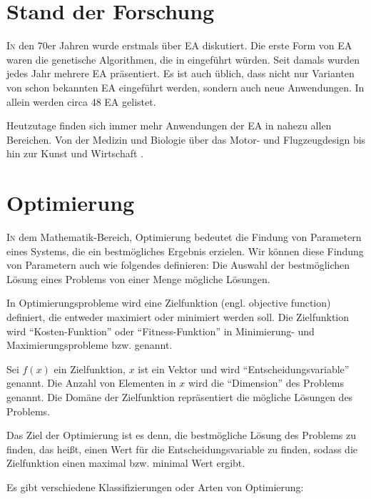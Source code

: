 \documentclass[twoside,twocolumn]{article}
\begin{document}

\section{Stand der Forschung}

\lettrine[nindent=0em,lines=3]{I} n den 70er Jahren wurde erstmals über EA diskutiert. Die erste Form von EA waren die genetische Algorithmen, die in \cite{holland_ga} eingeführt würden. Seit damals wurden jedes Jahr mehrere EA präsentiert. Es ist auch üblich, dass nicht nur Varianten von schon bekannten EA eingeführt werden, sondern auch neue Anwendungen. In \cite{algorithmen_list} allein werden circa 48 EA gelistet.\par
Heutzutage finden sich immer mehr Anwendungen der EA in nahezu allen Bereichen. Von der Medizin \cite{ea_und_medizin} und Biologie \cite{ea_und_biologie} über das Motor- \cite{ea_und_motoren} und Flugzeugdesign \cite{ea_und_flugzeuge_a} \cite{ea_und_flugzeuge_b} bis hin zur Kunst \cite{ea_und_kunst_a} \cite{ea_und_kunst_b} und Wirtschaft \cite{ea_und_wirtschaft}.


\section{Optimierung}

\lettrine[nindent=0em,lines=3]{I} n dem Mathematik-Bereich, Optimierung bedeutet die Findung von Parametern eines Systems, die ein bestmögliches Ergebnis erzielen. \cite{wiki_optimierung} Wir können diese Findung von Parametern auch wie folgendes definieren: Die Auswahl der bestmöglichen Lösung eines Problems von einer Menge mögliche Lösungen.\par
In Optimierungsprobleme wird eine Zielfunktion (engl. objective function) definiert, die entweder maximiert oder minimiert werden soll. Die Zielfunktion wird \enquote{Kosten-Funktion} oder \enquote{Fitness-Funktion} in Minimierung- und Maximierungsprobleme bzw. genannt.\par
Sei $f(x)$ ein Zielfunktion, $x$ ist ein Vektor und wird \enquote{Entscheidungsvariable} genannt. Die Anzahl von Elementen in $x$ wird die \enquote{Dimension} des Problems genannt.
Die Domäne der Zielfunktion repräsentiert die mögliche Lösungen des Problems. \par
Das Ziel der Optimierung ist es denn, die bestmögliche Lösung des Problems zu finden, das heißt, einen Wert für die Entscheidungsvariable zu finden, sodass die Zielfunktion einen maximal bzw. minimal Wert ergibt.\par
Es gibt verschiedene Klassifizierungen oder Arten von Optimierung:
\end{document}
